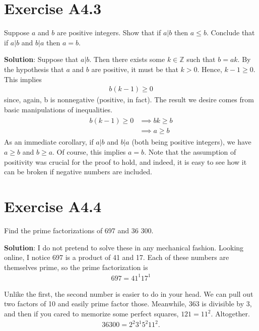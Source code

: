 \documentclass{book}
\begin{document}
\section*{Exercise A4.3} 
    Suppose $a$ and $b$ are positive integers. Show that if $a|b$ then $a\leq b$. Conclude that if $a|b$ and $b|a$ then $a=b$.
    
    \textbf{Solution}: Suppose that $a|b$. Then there exists some $k\in \mathbb{Z}$ such that $b = ak$. By the hypothesis that $a$ and $b$ are positive, it must be that $k>0$. Hence, $k-1\geq0$. This implies
    \begin{align}
        b(k-1) \geq 0
    \end{align}
    since, again, b is nonnegative (positive, in fact). The result we desire comes from basic manipulations of inequalities.
    \begin{align}
    \begin{aligned}
        b(k-1) \geq 0 &\implies bk \geq b \\
        &\implies a \geq b
    \end{aligned}
    \end{align}
    As an immediate corollary, if $a|b$ and $b|a$ (both being positive integers), we have $a\geq b$ and $b\geq a$. Of course, this implies $a = b$. Note that the assumption of positivity was crucial for the proof to hold, and indeed, it is easy to see how it can be broken if negative numbers are included.

\section*{Exercise A4.4}
    Find the prime factorizations of 697 and 36 300.
    
    \textbf{Solution}: I do not pretend to solve these in any mechanical fashion. Looking online, I notice 697 is a product of 41 and 17. Each of these numbers are themselves prime, so the prime factorization is 
    \begin{align}
        697 =41^1 17^1
    \end{align}
    
    Unlike the first, the second number is easier to do in your head. We can pull out two factors of 10 and easily prime factor those. Meanwhile, 363 is divisible by 3, and then if you cared to memorize some perfect squares, $121= 11^2$. Altogether.
    \begin{align}
        36300 = 2^2 3^1 5^2 11^2.
    \end{align}
\end{document}
